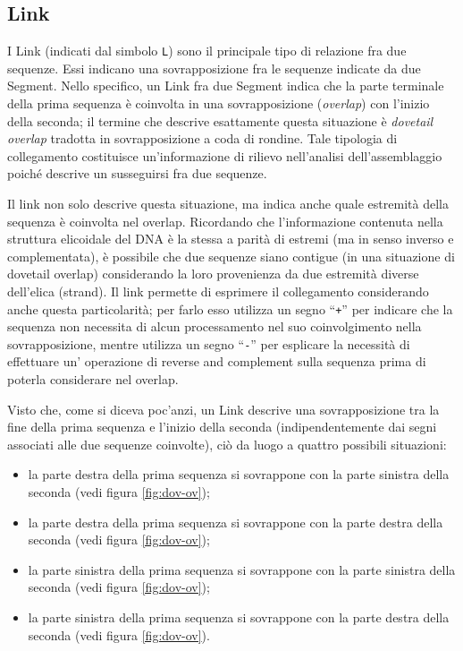 \subsection{Link}
\label{sec:link}
I Link (indicati dal simbolo \texttt{L}) sono il principale
tipo di relazione fra due sequenze. Essi
indicano una sovrapposizione fra le sequenze indicate da due Segment.
Nello specifico, un Link fra due Segment indica che la parte terminale
della prima sequenza è coinvolta in una sovrapposizione (\emph{overlap})
con l'inizio della seconda; il termine che descrive esattamente questa situazione
è \emph{dovetail overlap} tradotta in sovrapposizione a coda di rondine.
Tale tipologia di collegamento costituisce
un'informazione di rilievo nell'analisi dell'assemblaggio poiché descrive
un susseguirsi fra due sequenze.

Il link non solo descrive questa situazione, ma indica anche quale
estremità della sequenza è coinvolta nel overlap. Ricordando che
l'informazione contenuta nella struttura elicoidale del DNA è la stessa a parità
di estremi (ma in senso inverso e complementata), è possibile
che due sequenze siano contigue (in una situazione di dovetail
overlap) considerando la loro provenienza da due estremità
diverse dell'elica (strand).
Il link permette di esprimere il collegamento considerando anche questa
particolarità; per farlo esso utilizza un segno ``\texttt{+}'' per indicare
che la sequenza non necessita di alcun processamento nel suo
coinvolgimento nella sovrapposizione, mentre utilizza un segno ``\texttt{-}''
per esplicare la necessità di effettuare un' operazione di reverse
and complement sulla sequenza prima di poterla considerare
nel overlap.

Visto che, come si diceva poc'anzi, un Link descrive una sovrapposizione
tra la fine della prima sequenza e l'inizio della seconda (indipendentemente
dai segni associati alle due sequenze coinvolte), ciò da luogo a quattro
possibili situazioni:
\begin{itemize}
	\item la parte destra della prima sequenza si sovrappone con la parte
		sinistra della seconda (vedi figura \ref{fig:dov-ov});
	\item la parte destra della prima sequenza si sovrappone con la parte
		destra della seconda (vedi figura \ref{fig:dov-ov});
	\item la parte sinistra della prima sequenza si sovrappone con la parte
		sinistra della seconda (vedi figura \ref{fig:dov-ov});
	\item la parte sinistra della prima sequenza si sovrappone con la parte
		destra della seconda (vedi figura \ref{fig:dov-ov}).
\end{itemize}

